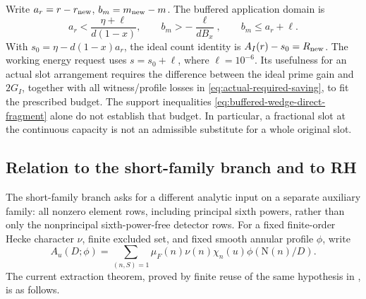 \documentclass[11pt]{article}
\theoremstyle{definition}
\newcommand{\N}{\mathrm N}
\begin{document}
Write \(a_r=r-r_{\rm new}\), \(b_m=m_{\rm new}-m\).  The buffered
application domain is
\begin{equation}
 a_r<\frac{\eta+\ell}{d(1-x)},\qquad
 b_m>-\frac{\ell}{dB_x},\qquad b_m\le a_r+\ell.
 \label{eq:buffered-wedge-direct-fragment}
\end{equation}
With \(s_0=\eta-d(1-x)a_r\), the ideal count identity is
\(A_I(r)-s_0=R_{\rm new}\).  The working energy request uses
\(s=s_0+\ell\), where \(\ell=10^{-6}\).  Its usefulness for an actual
slot arrangement requires the difference between the ideal prime gain
and \(2G_I\), together with all witness/profile losses in
\eqref{eq:actual-required-saving}, to fit the prescribed budget.
The support inequalities \eqref{eq:buffered-wedge-direct-fragment}
alone do not establish that budget.  In particular, a fractional slot
at the continuous capacity is not an admissible substitute for a whole
original slot.

\subsection{Relation to the short-family branch and to RH}

The short-family branch asks for a different analytic input on a separate auxiliary family: all nonzero element rows, including principal sixth powers, rather than only the nonprincipal sixth-power-free detector rows.  For a fixed
finite-order Hecke character \(\nu\), finite excluded set, and fixed
smooth annular profile \(\phi\), write
\[
 A_u(D;\phi)=\sum_{(n,S)=1}\mu_F(n)\nu(n)\chi_n(u)
                         \phi(\N(n)/D).
\]
The current extraction theorem, proved by finite reuse of the same
hypothesis in \cite{sf}, is as follows.
\end{document}
